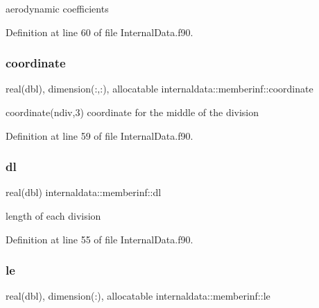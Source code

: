 aerodynamic coefficients 



Definition at line 60 of file Internal\+Data.\+f90.

\mbox{\label{structinternaldata_1_1memberinf_aa467d076d70681ba6154b70aba9d957e}} 
\subsubsection{\texorpdfstring{coordinate}{coordinate}}
{\footnotesize\ttfamily real(dbl), dimension(\+:,\+:), allocatable internaldata\+::memberinf\+::coordinate}



coordinate(ndiv,3) coordinate for the middle of the division 



Definition at line 59 of file Internal\+Data.\+f90.

\mbox{\label{structinternaldata_1_1memberinf_ace9954daa2b77364ae4984df951fa4d3}} 
\subsubsection{\texorpdfstring{dl}{dl}}
{\footnotesize\ttfamily real(dbl) internaldata\+::memberinf\+::dl}



length of each division 



Definition at line 55 of file Internal\+Data.\+f90.

\mbox{\label{structinternaldata_1_1memberinf_a4328603e20b1c327a37c30020048d96f}} 
\subsubsection{\texorpdfstring{le}{le}}
{\footnotesize\ttfamily real(dbl), dimension(\+:), allocatable internaldata\+::memberinf\+::le}



